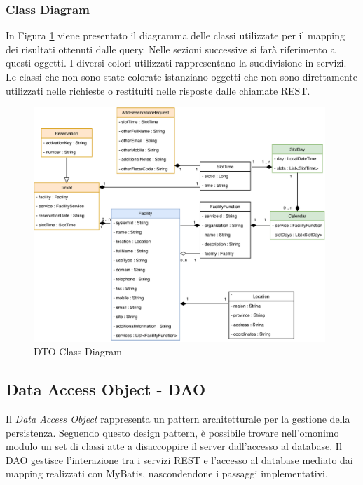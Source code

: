 \subsubsection{Class Diagram}
In Figura \ref{fig:classdiagram} viene presentato il diagramma delle classi utilizzate per il mapping dei risultati ottenuti dalle query. Nelle sezioni successive si farà riferimento a questi oggetti. I diversi colori utilizzati rappresentano la suddivisione in servizi. Le classi che non sono state colorate istanziano oggetti che non sono direttamente utilizzati nelle richieste o restituiti nelle risposte dalle chiamate REST.
\begin{figure}[H]
    \centering
    \includegraphics[width=0.98\textwidth]{images/03_4_class_diagram.pdf}
    \caption{DTO Class Diagram}
    \label{fig:classdiagram}
\end{figure}

\subsection{Data Access Object - DAO}
Il \emph{Data Access Object} rappresenta un pattern architetturale per la gestione della persistenza. Seguendo questo design pattern, è possibile trovare nell'omonimo modulo un set di classi atte a disaccoppire il server dall'accesso al database. Il DAO gestisce l'interazione tra i servizi REST e l'accesso al database mediato dai mapping realizzati con MyBatis, nascondendone i passaggi implementativi.

